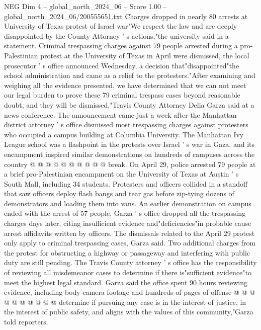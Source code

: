 \begin{textsample}{NEG Dim 4 – global\_north\_2024\_06 – Score 1.00 – global\_north\_2024\_06/200555651.txt}  \label{ex:f4_neg_324}
Charges dropped in nearly 80 arrests at University of Texas protest of Israel war"We respect the law and are deeply disappointed by the County Attorney ' s actions,"the university said in a statement.
Criminal trespassing charges against 79 people arrested during a pro-Palestinian protest at the University of Texas in April were dismissed, the local prosecutor ' s office announced Wednesday, a decision that"disappointed"the school administration and came as a relief to the protesters."After examining and weighing all the evidence presented, we have determined that we can not meet our legal burden to prove these 79 criminal trespass cases beyond reasonable doubt, and they will be dismissed,"Travis County Attorney Delia Garza said at a news conference.
The announcement came just a week after the Manhattan district attorney ' s office dismissed most trespassing charges against protesters who occupied a campus building at Columbia University.
The Manhattan Ivy League school was a flashpoint in the protests over Israel ' s war in Gaza, and its encampment inspired similar demonstrations on hundreds of campuses across the country @ @ @ @ @ @ @ @ @ @ break.
On April 29, police arrested 79 people at a brief pro-Palestinian encampment on the University of Texas at Austin ' s South Mall, including 34 students.
Protesters and officers collided in a standoff that saw officers deploy flash bangs and tear gas before zip-tying dozens of demonstrators and loading them into vans.
An earlier demonstration on campus ended with the arrest of 57 people.
Garza ' s office dropped all the trespassing charges days later, citing insufficient evidence and"deficiencies"in probable cause arrest affidavits written by officers.
The dismissals related to the April 29 protest only apply to criminal trespassing cases, Garza said.
Two additional charges from the protest for obstructing a highway or passageway and interfering with public duty are still pending.
The Travis County attorney ' s office has the responsibility of reviewing all misdemeanor cases to determine if there is"sufficient evidence"to meet the highest legal standard.
Garza said the office spent 90 hours reviewing evidence, including body camera footage and hundreds of pages of offense @ @ @ @ @ @ @ @ @ @ determine if pursuing any case is in the interest of justice, in the interest of public safety, and aligns with the values of this community,"Garza told reporters.

\end{textsample}
